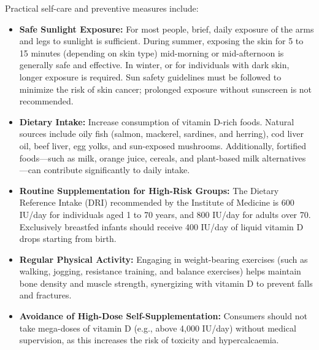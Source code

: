 Practical self-care and preventive measures include:
\begin{itemize}
    \item \textbf{Safe Sunlight Exposure:} For most people, brief, daily exposure of the arms and legs to sunlight is sufficient. During summer, exposing the skin for 5 to 15 minutes (depending on skin type) mid-morning or mid-afternoon is generally safe and effective. In winter, or for individuals with dark skin, longer exposure is required. Sun safety guidelines must be followed to minimize the risk of skin cancer; prolonged exposure without sunscreen is not recommended.
    \item \textbf{Dietary Intake:} Increase consumption of vitamin D-rich foods. Natural sources include oily fish (salmon, mackerel, sardines, and herring), cod liver oil, beef liver, egg yolks, and sun-exposed mushrooms. Additionally, fortified foods---such as milk, orange juice, cereals, and plant-based milk alternatives---can contribute significantly to daily intake.
    \item \textbf{Routine Supplementation for High-Risk Groups:} The Dietary Reference Intake (DRI) recommended by the Institute of Medicine is 600 IU/day for individuals aged 1 to 70 years, and 800 IU/day for adults over 70. Exclusively breastfed infants should receive 400 IU/day of liquid vitamin D drops starting from birth.
    \item \textbf{Regular Physical Activity:} Engaging in weight-bearing exercises (such as walking, jogging, resistance training, and balance exercises) helps maintain bone density and muscle strength, synergizing with vitamin D to prevent falls and fractures.
    \item \textbf{Avoidance of High-Dose Self-Supplementation:} Consumers should not take mega-doses of vitamin D (e.g., above 4,000 IU/day) without medical supervision, as this increases the risk of toxicity and hypercalcaemia.
\end{itemize}

